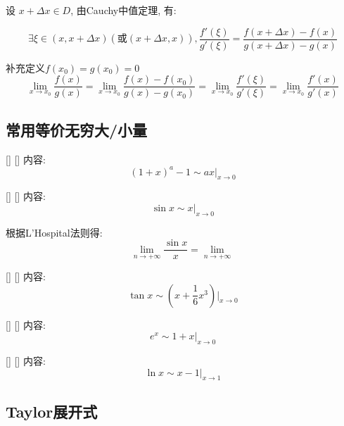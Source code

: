 \documentclass[UTF8]{ctexart}
\begin{document}
			\begin{prf}
				
				设 \(x+\Delta x\in D\), 由Cauchy中值定理, 有: 

				\[\exists\xi\in(x,x+\Delta x)(\text{或}(x+\Delta x,x)),\frac{f'(\xi)}{g'(\xi)}=\frac{f(x+\Delta x)-f(x)}{g(x+\Delta x)-g(x)}\]

				补充定义\(f(x_0)=g(x_0)=0\)
				\[\lim_{x\to x_0}\frac{f(x)}{g(x)}=\lim_{x\to x_0}\frac{f(x)-f(x_0)}{g(x)-g(x_0)}=\lim_{x\to x_0}\frac{f'(\xi)}{g'(\xi)}=\lim_{x\to x_0}\frac{f'(x)}{g'(x)}\]

			\end{prf}

		\subsection{常用等价无穷大/小量}
		
			\begin{xmp}
			    []
			    {}
			    []
			    []
				内容: 
				\[(1+x)^a-1\sim ax|_{x\to 0}\]
			\end{xmp}

			\begin{xmp}
			    []
			    {}
			    []
			    []
				内容: 
				\[\sin x\sim x|_{x\to 0}\]
			\end{xmp}

			\begin{prf}
				
				根据L'Hospital法则得: 
				\[\lim_{n\to+\infty}\frac{\sin x}{x}=\lim_{n\to+\infty}\frac{}{}\]

			\end{prf}

			\begin{xmp}
			    []
			    {}
			    []
			    []
				内容: 
				\[\tan x\sim \left(x+\frac{1}{6}x^3\right)|_{x\to 0}\]
			\end{xmp}
			
			\begin{xmp}
			    []
			    {}
			    []
			    []
				内容: 
				\[e^x\sim 1+x|_{x\to 0}\]
			\end{xmp}
			
			\begin{xmp}
			    []
			    {}
			    []
			    []
				内容: 
				\[\ln x\sim x-1|_{x\to 1}\]
			\end{xmp}
				
		\subsection{Taylor展开式}
			
\end{document}
